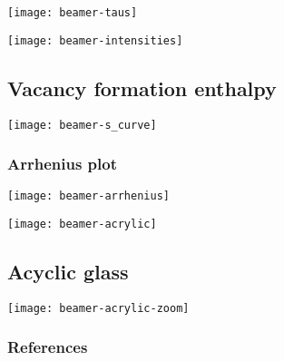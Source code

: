 \documentclass[english, fleqn]{beamer}
\begin{document}
\begin{frame}
    \texttt{[image: beamer-taus]}
\end{frame}

\begin{frame}
    \texttt{[image: beamer-intensities]}
\end{frame}

\subsection{Vacancy formation enthalpy}

\begin{frame}
    \texttt{[image: beamer-s\_curve]}
\end{frame}

\begin{frame}
    \frametitle{Arrhenius plot}

    \texttt{[image: beamer-arrhenius]}
\end{frame}

\begin{frame}
    \texttt{[image: beamer-acrylic]}
\end{frame}

\subsection{Acyclic glass}

\begin{frame}
    \texttt{[image: beamer-acrylic-zoom]}
\end{frame}


\begin{frame}
    \frametitle{References}

    \printbibliography
\end{frame}
\end{document}
